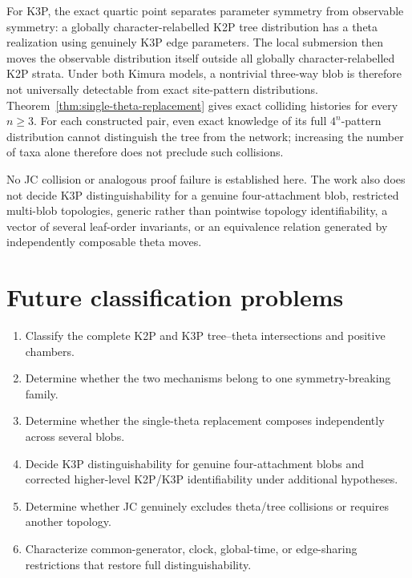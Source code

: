\documentclass[11pt]{article}
\theoremstyle{remark}\newtheorem{remark}[theorem]{Remark}
\begin{document}
For K3P, the exact quartic point separates parameter symmetry from observable symmetry: a globally character-relabelled K2P tree distribution has a theta realization using genuinely K3P edge parameters. The local submersion then moves the observable distribution itself outside all globally character-relabelled K2P strata. Under both Kimura models, a nontrivial three-way blob is therefore not universally detectable from exact site-pattern distributions. Theorem~\ref{thm:single-theta-replacement} gives exact colliding histories for every $n\ge3$. For each constructed pair, even exact knowledge of its full $4^n$-pattern distribution cannot distinguish the tree from the network; increasing the number of taxa alone therefore does not preclude such collisions.

No JC collision or analogous proof failure is established here. The work also does not decide K3P distinguishability for a genuine four-attachment blob, restricted multi-blob topologies, generic rather than pointwise topology identifiability, a vector of several leaf-order invariants, or an equivalence relation generated by independently composable theta moves.

\section{Future classification problems}
\begin{enumerate}
\item Classify the complete K2P and K3P tree--theta intersections and positive chambers.
\item Determine whether the two mechanisms belong to one symmetry-breaking family.
\item Determine whether the single-theta replacement composes independently across several blobs.
\item Decide K3P distinguishability for genuine four-attachment blobs and corrected higher-level K2P/K3P identifiability under additional hypotheses.
\item Determine whether JC genuinely excludes theta/tree collisions or requires another topology.
\item Characterize common-generator, clock, global-time, or edge-sharing restrictions that restore full distinguishability.
\end{enumerate}
\end{document}
